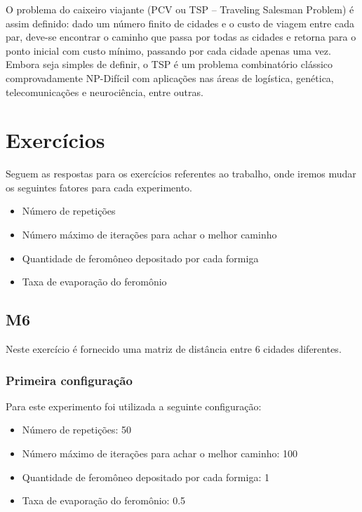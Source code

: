 \documentclass[hidelinks,12pt]{article}
\begin{document}
	O problema do caixeiro viajante (PCV ou TSP – Traveling Salesman Problem) é assim definido: dado um número finito de cidades e o custo de viagem entre cada par, deve-se encontrar o caminho que passa por todas as cidades e retorna para o ponto inicial com custo mínimo, passando por cada cidade apenas uma vez. Embora seja simples de definir, o TSP é um problema combinatório clássico comprovadamente NP-Difícil com aplicações nas áreas de logística, genética, telecomunicações e neurociência, entre outras.	 
		
\section{Exercícios}

	Seguem as respostas para os exercícios referentes ao trabalho, onde iremos mudar os seguintes fatores para cada experimento.
	
	\begin{itemize}
		\item Número de repetições
		\item Número máximo de iterações para achar o melhor caminho
		\item Quantidade de feromôneo depositado por cada formiga
		\item Taxa de evaporação do feromônio
	\end{itemize}

	
	\subsection{M6}
			Neste exercício é fornecido uma matriz de distância entre 6 cidades diferentes.	
		\subsubsection{Primeira configuração}
		 	Para este experimento foi utilizada a seguinte configuração:

		 	\begin{itemize}
				\item Número de repetições: 50
				\item Número máximo de iterações para achar o melhor caminho: 100
				\item Quantidade de feromôneo depositado por cada formiga: 1
				\item Taxa de evaporação do feromônio: 0.5
			\end{itemize}

		\newpage			
			
\end{document}
